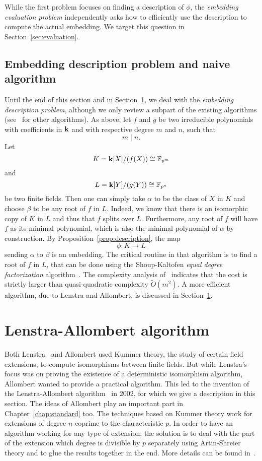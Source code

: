 While the first problem focuses on finding a description of $\phi$, the
\emph{embedding evaluation problem} independently asks how to efficiently use
the description to compute the actual embedding. We target this question in
Section~\ref{sec:evaluation}.

\subsection{Embedding description problem and naive algorithm}

Until the end of this section and in Section~\ref{sec:allombert}, we deal with
the \emph{embedding description problem}, although we only review a subpart of
the existing algorithms (see~\cite{BDDFS17} for other algorithms). As above, let
$f$ and $g$ be two irreducible polynomials with coefficients in $\mathbf{k}$ and with
respective degree $m$ and $n$, such that
\[
  m\mid n.
\]
Let
\[
  K=\mathbf{k}[X]/(f(X))\cong\mathbb{F}_{p^m}
\]
and
\[
  L = \mathbf{k}[Y]/(g(Y))\cong\mathbb{F}_{p^n}
\]
be two finite fields. Then one can simply take $\alpha$ to be the class of $X$ in
$K$ and choose $\beta$ to be any root of $f$ in $L$. Indeed, we know that there
is an isomorphic copy of $K$ in $L$ and thus that $f$ splits over $L$.
Furthermore, any root of $f$ will have $f$ as its minimal polynomial, which is
also the minimal polynomial of $\alpha$ by construction. By
Proposition~\ref{prop:description}, the map 
\[
  \phi:K\to L
\]
sending $\alpha$ to $\beta$ is an embedding. The critical routine in that
algorithm is to find a root of $f$ in $L$, that can be done using the
Shoup-Kaltofen \emph{equal degree factorization} algorithm~\cite{KS97}. The
complexity analysis of~\cite{BDDFS17} indicates that the cost is strictly larger
than quasi-quadratic complexity $\tilde O(m^2)$. A more efficient algorithm, due
to Lenstra and Allombert, is discussed in Section~\ref{sec:allombert}.

\section{Lenstra-Allombert algorithm}
\label{sec:allombert}

Both Lenstra~\cite{Lenstra91} and Allombert used
Kummer theory, the study of certain field extensions, to compute isomorphisms
between finite fields. But while Lenstra's focus
was on proving the existence of a deterministic isomorphism algorithm, Allombert 
wanted to provide a practical algorithm. This led to the invention of the
Lenstra-Allombert algorithm~\cite{Allombert02} in 2002, for which we give a
description in this section. The ideas of Allombert play an important part in
Chapter~\ref{chap:standard} too. The techniques based on Kummer theory work
for extensions of degree $n$ coprime to the characteristic $p$. In order to have
an algorithm working for any type of extension, the solution is to deal with the
part of the extension which degree is divisible by $p$ separately using
Artin-Shreier theory and to glue the results together in the end. More details
can be found in~\cite[Section 3.2]{BDDFS17}.

